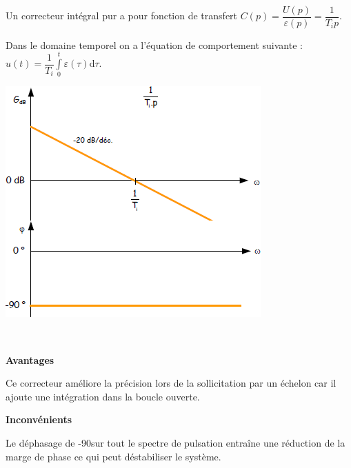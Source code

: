 \documentclass[10pt,fleqn]{article} %
\begin{document}
\noindent\begin{minipage}[c]{.49\linewidth}
\begin{defi}  ~\\

Un correcteur intégral pur a pour fonction de transfert $C(p)=\dfrac{U(p)}{\varepsilon(p)}=\dfrac{1}{T_i p}$.

Dans le domaine temporel on a l'équation de comportement suivante : $u(t)=\dfrac{1}{T_i}\int\limits_0^t \varepsilon (\tau)\text{d}\tau$.
\end{defi}

\end{minipage} \hfill
\begin{minipage}[c]{.49\linewidth}
\begin{center}
\includegraphics[width=.7\linewidth]{images/fig_06}
\end{center}
\end{minipage}

\begin{resultat} ~\\
\vspace{-1.5cm}
\begin{multicols}{2}
\begin{center}
\textbf{Avantages}
\end{center}
Ce correcteur améliore la précision lors de la sollicitation par un échelon car il ajoute une intégration dans la boucle ouverte. 
\begin{center}
\textbf{Inconvénients}
\end{center}
Le déphasage de -90\degres sur tout le spectre de pulsation entraîne une réduction de la marge de phase ce qui peut déstabiliser le système. 
\end{multicols}
\end{resultat}
\end{document}
